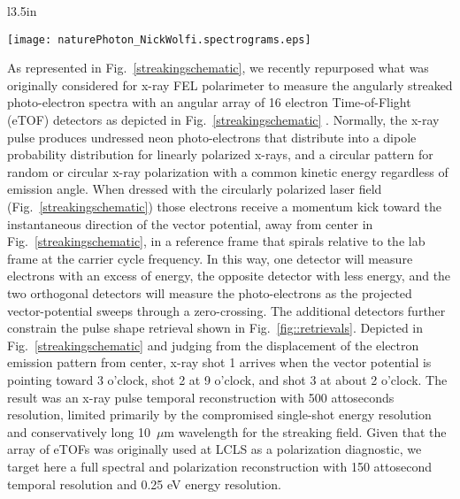 \begin{wrapfigure}[22]{l}{3.5in}
\vspace{-0.5\baselineskip}
\centerline{\texttt{[image: naturePhoton\_NickWolfi.spectrograms.eps]}}
\vspace{-0.5\baselineskip}
\caption{\label{fig::retrievals}X-ray pulse shape retrievals reproduced from Ref.~\cite{Nick2018}.}
\end{wrapfigure}
As represented in Fig.~\ref{streakingschematic}, we recently repurposed what was originally considered for x-ray FEL polarimeter \cite{Markus2014,Allaria2014,Mazza2014,Lutman2016} to measure the angularly streaked photo-electron spectra with an angular array of 16 electron Time-of-Flight (eTOF) detectors as depicted in Fig.~\ref{streakingschematic} \cite{Nick2018}.
Normally, the x-ray pulse produces undressed neon photo-electrons that distribute into a dipole probability distribution for linearly polarized x-rays, and a circular pattern for random or circular x-ray polarization with a common kinetic energy regardless of emission angle.
When dressed with the circularly polarized laser field (Fig.~\ref{streakingschematic}) those electrons receive a momentum kick toward the instantaneous direction of the vector potential, away from center in Fig.~\ref{streakingschematic}, in a reference frame that spirals relative to the lab frame at the carrier cycle frequency.
In this way, one detector will measure electrons with an excess of energy, the opposite detector with less energy, and the two orthogonal detectors will measure the photo-electrons as the projected vector-potential sweeps through a zero-crossing.
The additional detectors further constrain the pulse shape retrieval shown in Fig.~\ref{fig::retrievals}.
Depicted in Fig.~\ref{streakingschematic} and judging from the displacement of the electron emission pattern from center, x-ray shot 1 arrives when the vector potential is pointing toward 3 o'clock, shot 2 at 9 o'clock, and shot 3 at about 2 o'clock.
The result was an x-ray pulse temporal reconstruction with 500 attoseconds resolution, limited primarily by the compromised single-shot energy resolution and conservatively long 10~$\mu$m wavelength for the streaking field. 
Given that the array of eTOFs was originally used at LCLS as a polarization diagnostic, we target here a full spectral and polarization reconstruction with 150 attosecond temporal resolution and 0.25 eV energy resolution.

